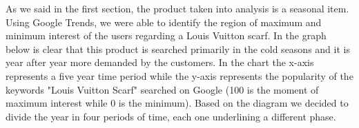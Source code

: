 As we said in the first section, the product taken into analysis is a seasonal item. Using Google Trends, we were able to identify the region of maximum and minimum interest of the users regarding a Louis Vuitton scarf. In the graph below is clear that this product is searched primarily in the cold seasons and it is year after year more demanded by the customers. In the chart the x-axis represents a five year time period while the y-axis represents the popularity of the keywords "Louis Vuitton Scarf" searched on Google (100 is the moment of maximum interest while 0 is the minimum).
Based on the diagram we decided to divide the year in four periods of time, each one underlining a different phase.\newline\\

